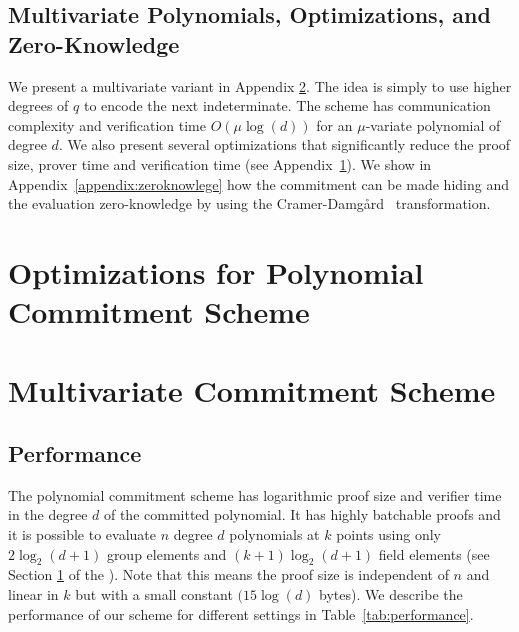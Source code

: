 \ifappendix
\subsection{Multivariate Polynomials, Optimizations, and Zero-Knowledge}
We present a multivariate variant in Appendix \ref{sec:multivariate}. The idea is simply to use higher degrees of $q$ to encode the next indeterminate. The scheme has communication complexity and verification time $O(\mu \log(d))$ for an $\mu$-variate polynomial of degree $d$. We also present several optimizations that significantly reduce the proof size, prover time and verification time (see Appendix~\ref{subsec:optimization}). We show in Appendix~\ref{appendix:zeroknowlege} how the commitment can be made hiding and the evaluation zero-knowledge by using the Cramer-Damg\aa{}rd~\cite{C:CraDam98} transformation.
\else
\section{Optimizations for Polynomial Commitment Scheme}
\label{subsec:optimization}

\section{Multivariate Commitment Scheme}
\label{sec:multivariate}


\fi

\subsection{Performance}
The polynomial commitment scheme has logarithmic proof size and verifier time in the degree $d$ of the committed polynomial. 
It has highly batchable proofs and it is possible to evaluate $n$ degree $d$ polynomials at $k$ points using only $2\log_2(d+1)$ group elements and $(k+1)\log_2(d+1)$ field elements (see Section \ref{subsec:optimization} of the \appendixphrase). Note that this means the proof size is independent of $n$ and linear in $k$ but with a small constant $(15 \log(d)$ bytes). 
We describe the performance of our scheme for different settings in Table~\ref{tab:performance}.

